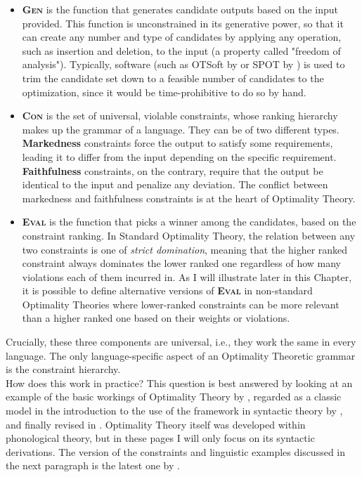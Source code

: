 \begin{itemize}
    \item \textsc{\textbf{Gen}} is the function that generates candidate outputs based on the input provided. This function is unconstrained in its generative power, so that it can create any number and type of candidates by applying any operation, such as insertion and deletion, to the input (a property called "freedom of analysis"). Typically, software (such as OTSoft by \textcite{hayes2003otsoft} or SPOT by \textcite{bellik2019automated}) is used to trim the candidate set down to a feasible number of candidates to the optimization, since it would be time-prohibitive to do so by hand.
    \item \textsc{\textbf{Con}} is the set of universal, violable constraints, whose ranking hierarchy makes up the grammar of a language. They can be of two different types. \textbf{Markedness} constraints force the output to satisfy some requirements, leading it to differ from the input depending on the specific requirement. \textbf{Faithfulness} constraints, on the contrary, require that the output be identical to the input and penalize any deviation. The conflict between markedness and faithfulness constraints is at the heart of Optimality Theory.
    \item \textsc{\textbf{Eval}} is the function that picks a winner among the candidates, based on the constraint ranking. In Standard Optimality Theory, the relation between any two constraints is one of \textit{strict domination}, meaning that the higher ranked constraint always dominates the lower ranked one regardless of how many violations each of them incurred in. As I will illustrate later in this Chapter, it is possible to define alternative versions of \textsc{\textbf{Eval}} in non-standard Optimality Theories where lower-ranked constraints can be more relevant than a higher ranked one based on their weights or violations.
\end{itemize}
Crucially, these three components are universal, i.e., they work the same in every language. The only language-specific aspect of an Optimality Theoretic grammar is the constraint hierarchy.\\
How does this work in practice? This question is best answered by looking at an example of the basic workings of Optimality Theory by \textcite{grimshaw1998optimal}, regarded as a classic model in the introduction to the use of the framework in syntactic theory by \textcite{legendre2001introduction}, and finally revised in \textcite{legendre2019otsyntax}. Optimality Theory itself was developed \parencite{princesmolensky1993optimality} within phonological theory, but in these pages I will only focus on its syntactic derivations. The version of the constraints and linguistic examples discussed in the next paragraph is the latest one by \textcite{legendre2019otsyntax}. 

